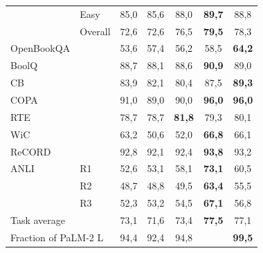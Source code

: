 \documentclass{article}
\begin{document}
\begin{table}[h]
\begin{tabular}{llccccc}
                     & Easy      & 85,0          & 85,6              & 88,0              & \textbf{89,7}     & 88,8                 \\
                     & Overall   & 72,6          & 72,6              & 76,5              & \textbf{79,5}     & 78,3                 \\
OpenBookQA           &           & 53,6          & 57,4              & 56,2              & 58,5              & \textbf{64,2}        \\ \midrule
BoolQ                &           & 88,7          & 88,1              & 88,6              & \textbf{90,9}     & 89,0                 \\
CB                   &           & 83,9          & 82,1              & 80,4              & 87,5              & \textbf{89,3}        \\
COPA                 &           & 91,0          & 89,0              & 90,0              & \textbf{96,0}     & \textbf{96,0}        \\
RTE                  &           & 78,7          & 78,7              & \textbf{81,8}     & 79,3              & 80,1                 \\
WiC                  &           & 63,2          & 50,6              & 52,0              & \textbf{66,8}     & 66,1                 \\
ReCORD               &           & 92,8          & 92,1              & 92,4              & \textbf{93,8}     & 93,2                 \\ \midrule
ANLI                 & R1        & 52,6          & 53,1              & 58,1              & \textbf{73,1}     & 60,5                 \\
                     & R2        & 48,7          & 48,8              & 49,5              & \textbf{63,4}     & 55,5                 \\
                     & R3        & 52,3          & 53,2              & 54,5              & \textbf{67,1}     & 56,8                 \\ \midrule \midrule
\multicolumn{2}{l}{Task average}                   & 73,1          & 71,6              & 73,4              & \textbf{77,5}     & 77,1                 \\
\multicolumn{2}{l}{Fraction of PaLM-2 L}           & 94,4          & 92,4              & 94,8              &              & \textbf{99,5}       \\ \bottomrule         
\end{tabular}
\end{table}
\end{document}
